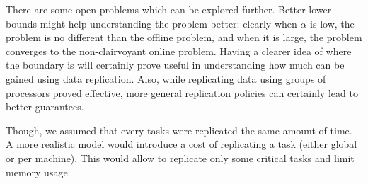\documentclass[10pt, conference, compsocconf]{IEEEtran}
\begin{document}
There are some open problems which can be explored further. Better
lower bounds might help understanding the problem better: clearly when
$\alpha$ is low, the problem is no different than the offline problem,
and when it is large, the problem converges to the non-clairvoyant
online problem. Having a clearer idea of where the boundary is will
certainly prove useful in understanding how much can be gained using
data replication. Also, while replicating data using groups of
processors proved effective, more general replication policies can
certainly lead to better guarantees.

Though, we assumed that every tasks were replicated the same amount of
time. A more realistic model would introduce a cost of replicating a
task (either global or per machine). This would allow to replicate
only some critical tasks and limit memory usage.


 
\end{document}

